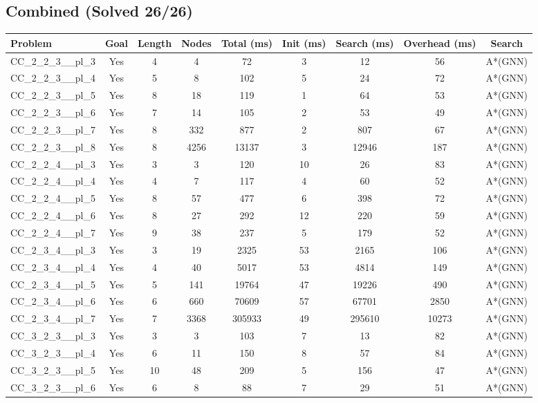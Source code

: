 \documentclass{article}
\begin{document}
\subsection*{Combined (Solved 26/26)}
\begin{tabular}{lcccccccc}
\toprule
Problem & Goal & Length & Nodes & Total (ms) & Init (ms) & Search (ms) & Overhead (ms) & Search \\
\midrule
CC\_2\_2\_3\_\_pl\_3 & Yes & 4 & 4 & 72 & 3 & 12 & 56 & A*(GNN) \\
CC\_2\_2\_3\_\_pl\_4 & Yes & 5 & 8 & 102 & 5 & 24 & 72 & A*(GNN) \\
CC\_2\_2\_3\_\_pl\_5 & Yes & 8 & 18 & 119 & 1 & 64 & 53 & A*(GNN) \\
CC\_2\_2\_3\_\_pl\_6 & Yes & 7 & 14 & 105 & 2 & 53 & 49 & A*(GNN) \\
CC\_2\_2\_3\_\_pl\_7 & Yes & 8 & 332 & 877 & 2 & 807 & 67 & A*(GNN) \\
CC\_2\_2\_3\_\_pl\_8 & Yes & 8 & 4256 & 13137 & 3 & 12946 & 187 & A*(GNN) \\
CC\_2\_2\_4\_\_pl\_3 & Yes & 3 & 3 & 120 & 10 & 26 & 83 & A*(GNN) \\
CC\_2\_2\_4\_\_pl\_4 & Yes & 4 & 7 & 117 & 4 & 60 & 52 & A*(GNN) \\
CC\_2\_2\_4\_\_pl\_5 & Yes & 8 & 57 & 477 & 6 & 398 & 72 & A*(GNN) \\
CC\_2\_2\_4\_\_pl\_6 & Yes & 8 & 27 & 292 & 12 & 220 & 59 & A*(GNN) \\
CC\_2\_2\_4\_\_pl\_7 & Yes & 9 & 38 & 237 & 5 & 179 & 52 & A*(GNN) \\
CC\_2\_3\_4\_\_pl\_3 & Yes & 3 & 19 & 2325 & 53 & 2165 & 106 & A*(GNN) \\
CC\_2\_3\_4\_\_pl\_4 & Yes & 4 & 40 & 5017 & 53 & 4814 & 149 & A*(GNN) \\
CC\_2\_3\_4\_\_pl\_5 & Yes & 5 & 141 & 19764 & 47 & 19226 & 490 & A*(GNN) \\
CC\_2\_3\_4\_\_pl\_6 & Yes & 6 & 660 & 70609 & 57 & 67701 & 2850 & A*(GNN) \\
CC\_2\_3\_4\_\_pl\_7 & Yes & 7 & 3368 & 305933 & 49 & 295610 & 10273 & A*(GNN) \\
CC\_3\_2\_3\_\_pl\_3 & Yes & 3 & 3 & 103 & 7 & 13 & 82 & A*(GNN) \\
CC\_3\_2\_3\_\_pl\_4 & Yes & 6 & 11 & 150 & 8 & 57 & 84 & A*(GNN) \\
CC\_3\_2\_3\_\_pl\_5 & Yes & 10 & 48 & 209 & 5 & 156 & 47 & A*(GNN) \\
CC\_3\_2\_3\_\_pl\_6 & Yes & 6 & 8 & 88 & 7 & 29 & 51 & A*(GNN) \\

\end{tabular}
\end{document}
